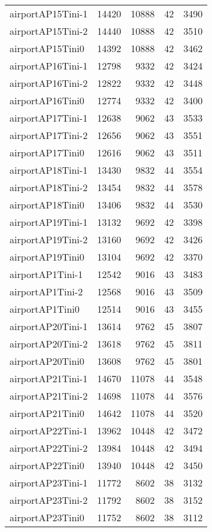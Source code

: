 \begin{tabular}{lrrrr}
airportAP15Tini-1 & 14420 & 10888 & 42 & 3490 \\
airportAP15Tini-2 & 14440 & 10888 & 42 & 3510 \\
airportAP15Tini0 & 14392 & 10888 & 42 & 3462 \\
airportAP16Tini-1 & 12798 & 9332 & 42 & 3424 \\
airportAP16Tini-2 & 12822 & 9332 & 42 & 3448 \\
airportAP16Tini0 & 12774 & 9332 & 42 & 3400 \\
airportAP17Tini-1 & 12638 & 9062 & 43 & 3533 \\
airportAP17Tini-2 & 12656 & 9062 & 43 & 3551 \\
airportAP17Tini0 & 12616 & 9062 & 43 & 3511 \\
airportAP18Tini-1 & 13430 & 9832 & 44 & 3554 \\
airportAP18Tini-2 & 13454 & 9832 & 44 & 3578 \\
airportAP18Tini0 & 13406 & 9832 & 44 & 3530 \\
airportAP19Tini-1 & 13132 & 9692 & 42 & 3398 \\
airportAP19Tini-2 & 13160 & 9692 & 42 & 3426 \\
airportAP19Tini0 & 13104 & 9692 & 42 & 3370 \\
airportAP1Tini-1 & 12542 & 9016 & 43 & 3483 \\
airportAP1Tini-2 & 12568 & 9016 & 43 & 3509 \\
airportAP1Tini0 & 12514 & 9016 & 43 & 3455 \\
airportAP20Tini-1 & 13614 & 9762 & 45 & 3807 \\
airportAP20Tini-2 & 13618 & 9762 & 45 & 3811 \\
airportAP20Tini0 & 13608 & 9762 & 45 & 3801 \\
airportAP21Tini-1 & 14670 & 11078 & 44 & 3548 \\
airportAP21Tini-2 & 14698 & 11078 & 44 & 3576 \\
airportAP21Tini0 & 14642 & 11078 & 44 & 3520 \\
airportAP22Tini-1 & 13962 & 10448 & 42 & 3472 \\
airportAP22Tini-2 & 13984 & 10448 & 42 & 3494 \\
airportAP22Tini0 & 13940 & 10448 & 42 & 3450 \\
airportAP23Tini-1 & 11772 & 8602 & 38 & 3132 \\
airportAP23Tini-2 & 11792 & 8602 & 38 & 3152 \\
airportAP23Tini0 & 11752 & 8602 & 38 & 3112 \\

\end{tabular}
